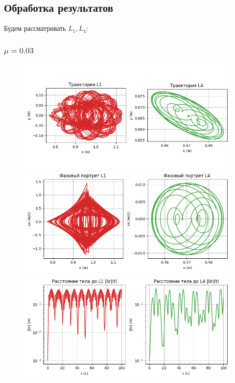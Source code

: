 \documentclass[12pt]{article}
\begin{document}
\subsection{Обработка результатов}

Будем рассматривать $L_1,L_4$:

\subsubsection{$\mu=0.03$}

\begin{figure}[H]
  \centering
  \includegraphics[width=1\textwidth]{Figure_1.png}
  \includegraphics[width=1\textwidth]{Figure_2.png}
  \includegraphics[width=1\textwidth]{Figure_3.png}
\end{figure}
\end{document}
